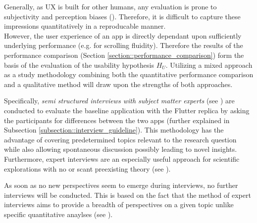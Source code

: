 Generally, as UX is built for other humans, any evaluation is prone to subjectivity and perception
biases (\cite{Tversky1974}). Therefore, it is difficult to capture these impressions quantitatively in a reproducable manner.\\
However, the user experience of an app is directly dependant upon sufficiently underlying performance (e.g. for scrolling
fluidity). Therefore the results of the performance comparison (Section \ref{section::performance_comparison}) form the basis of the evaluation of the usability hypothesis $H_U$.
Utilizing a mixed approach as a study methodology combining both the quantitative performance comparison and a qualitative method will draw upon the strengths of both approaches. 

Specifically, \textit{semi structured interviews with subject matter experts} (see \cite{Liebold2009}) are conducted to evaluate the baseline application
with the Flutter replica by asking the participants for differences between the two apps (further explained in Subsection \ref{subsection::interview_guideline}). This methodology has the
advantage of covering predetermined topics relevant to the research question while also allowing spontaneous discussion possibly leading to novel insights.\\
Furthermore, expert interviews are an especially useful approach for scientific explorations
with no or scant preexisting theory (see \cite{Experts2009}).

As soon as no new perspectives seem to emerge during interviews, no further interviews will be conducted.
This is based on the fact that the method of expert interviews 
aims to provide a breadth of perspectives on a given topic unlike specific quantitative anaylses (see \cite{Liebold2009}).


